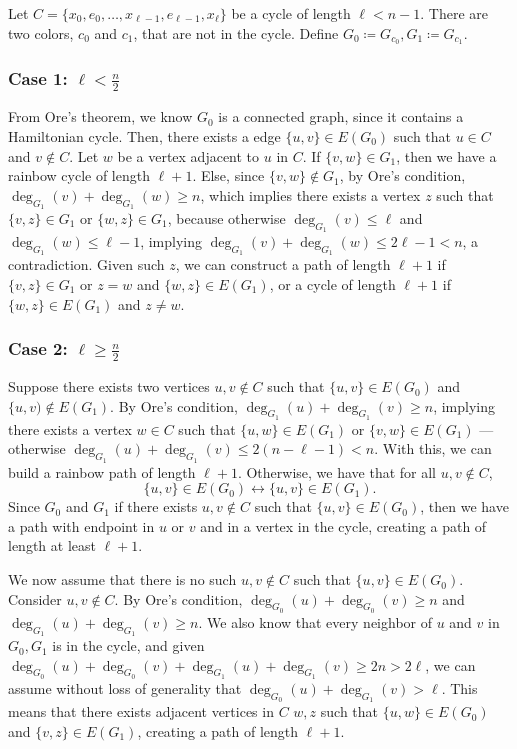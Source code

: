 Let \( C = \{x_0, e_0, \dots, x_{\ell-1}, e_{\ell-1}, x_{\ell}\} \) be a cycle of length \( \ell < n - 1 \).
There are two colors, $c_0$ and $c_1$, that are not in the cycle. Define \(G_0 \coloneqq G_{c_0}, G_1 \coloneqq G_{c_1} \).

\subsubsection{Case 1: \( \ell < \frac{n}{2} \)}

From Ore's theorem, we know \(G_0\) is a connected graph, since it contains a Hamiltonian cycle. 
Then, there exists a edge \( \{u, v\} \in E(G_0) \) such that \( u \in C \) and \( v \not\in C \). 
Let \(w\) be a vertex adjacent to \(u\) in \(C\). 
If \(\{v, w\} \in G_1\), then we have a rainbow cycle of length \( \ell+1 \). 
Else, since \( \{v, w\} \not\in G_1 \), by Ore's condition, \( \deg_{G_1}(v) + \deg_{G_1}(w) \geq n \),
which implies there exists a vertex \( z \) such that \( \{v, z\} \in G_1 \) or \( \{w, z\} \in G_1 \), because otherwise
\( \deg_{G_1}(v) \leq \ell \) and \( \deg_{G_1}(w) \leq \ell - 1 \), implying 
\( \deg_{G_1}(v) + \deg_{G_1}(w) \leq 2\ell - 1 < n \), a contradiction.
Given such \(z\), we can construct a path of length \( \ell+1 \) if \( \{v, z\} \in G_1 \) or 
\( z = w \) and \( \{w, z\} \in E(G_1) \), or a cycle of length \( \ell+1 \) if \( \{w, z\} \in E(G_1) \) and \(z \neq w\).

\subsubsection{Case 2: \( \ell \geq \frac{n}{2} \)}

Suppose there exists two vertices \( u, v \not\in C \) such that \( \{u, v\} \in E(G_0) \) and \( \{u, v) \not\in E(G_1) \).
By Ore's condition, 
\( \deg_{G_1}(u) + \deg_{G_1}(v) \geq n \), 
implying there exists a vertex \( w \in C \) such that \( \{u, w\} \in E(G_1) \) or \( \{v, w\} \in E(G_1) \) 
--- otherwise \( \deg_{G_1}(u) + \deg_{G_1}(v) \leq 2 (n - \ell - 1) < n \).
With this, we can build a rainbow path of length \( \ell+1 \).
Otherwise, we have that for all \( u, v \not\in C \), 
\[ \{u, v\} \in E(G_0) \leftrightarrow \{u, v\} \in E(G_1). \]
Since \(G_0\) and \(G_1\) if there exists \(u, v \not\in C\) such that \( \{u, v\} \in E(G_0) \), 
then we have a path with endpoint in \(u\) or \(v\) and in a vertex in the cycle, creating a path of length at 
least \( \ell + 1 \).

We now assume that there is no such \(u, v \not \in C\) such that \( \{u, v\} \in E(G_0) \).
Consider \( u, v \not\in C \). By Ore's condition, 
\( \deg_{G_0}(u) + \deg_{G_0}(v) \geq n \) and \( \deg_{G_1}(u) + \deg_{G_1}(v) \geq n \). 
We also know that every neighbor of \(u\) and \(v\) in \(G_0, G_1\) is in the cycle, and
given \( \deg_{G_0}(u) + \deg_{G_0}(v) + \deg_{G_1}(u) + \deg_{G_1}(v) \geq 2n > 2\ell \), we 
can assume without loss of generality that \( \deg_{G_0}(u) + \deg_{G_1}(v) > \ell \).
This means that there exists adjacent vertices in \(C\) \(w, z\) such that
\( \{u, w\} \in E(G_0) \) and \( \{v, z\} \in E(G_1) \), creating a path of length \( \ell+1 \).
